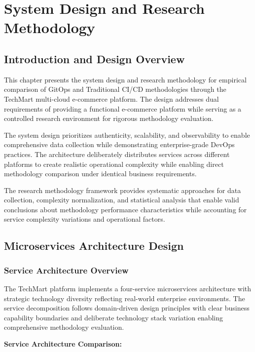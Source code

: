 \chapter{System Design and Research Methodology}

\section{Introduction and Design Overview}

This chapter presents the system design and research methodology for empirical comparison of GitOps and Traditional CI/CD methodologies through the TechMart multi-cloud e-commerce platform. The design addresses dual requirements of providing a functional e-commerce platform while serving as a controlled research environment for rigorous methodology evaluation.

The system design prioritizes authenticity, scalability, and observability to enable comprehensive data collection while demonstrating enterprise-grade DevOps practices. The architecture deliberately distributes services across different platforms to create realistic operational complexity while enabling direct methodology comparison under identical business requirements.

The research methodology framework provides systematic approaches for data collection, complexity normalization, and statistical analysis that enable valid conclusions about methodology performance characteristics while accounting for service complexity variations and operational factors.

\section{Microservices Architecture Design}

\subsection{Service Architecture Overview}

The TechMart platform implements a four-service microservices architecture with strategic technology diversity reflecting real-world enterprise environments. The service decomposition follows domain-driven design principles with clear business capability boundaries and deliberate technology stack variation enabling comprehensive methodology evaluation.

\textbf{Service Architecture Comparison:}

